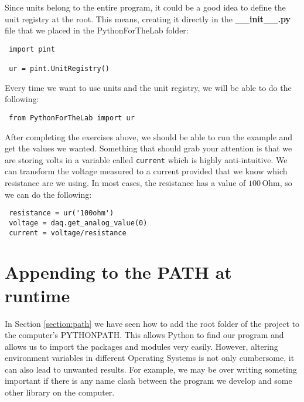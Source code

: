Since units belong to the entire program, it could be a good idea to define the unit registry at the root. This means, creating it directly in the \textbf{\_\_init\_\_.py} file that we placed in the PythonForTheLab folder:

\begin{verbatim}
 import pint
 
 ur = pint.UnitRegistry()
\end{verbatim}

Every time we want to use units and the unit registry, we will be able to do the following:

\begin{verbatim}
 from PythonForTheLab import ur
\end{verbatim}



After completing the exercises above, we should be able to run the example and get the values we wanted. Something that should grab your attention is that we are storing volts in a variable called \texttt{current} which is highly anti-intuitive. We can transform the voltage measured to a current provided that we know which resistance are we using. In most cases, the resistance has a value of $100\,\textrm{Ohm}$, so we can do the following:

\begin{verbatim}
 resistance = ur('100ohm')
 voltage = daq.get_analog_value(0)
 current = voltage/resistance
\end{verbatim}

\section{Appending to the PATH at runtime}\label{section:appending-path}
In Section \ref{section:path} we have seen how to add the root folder of the project to the computer's PYTHONPATH. This allows Python to find our program and allows us to import the packages and modules very easily. However, altering environment variables in different Operating Systems is not only cumbersome, it can also lead to unwanted results. For example, we may be over writing someting important if there is any name clash between the program we develop and some other library on the computer. 

